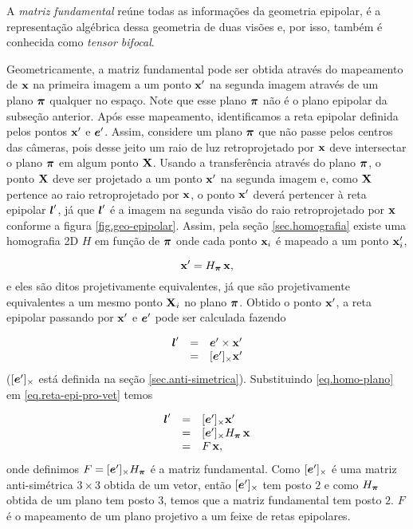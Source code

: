 A \textit{matriz fundamental} reúne todas as informações da geometria epipolar, é a representação algébrica dessa geometria de duas visões e, por isso, também é conhecida como \textit{tensor bifocal}. 

Geometricamente, a matriz fundamental pode ser obtida através do mapeamento de $\mathbf{x}$ na primeira imagem a um ponto $\mathbf{x}'$ na segunda imagem através de um plano $\boldsymbol{\pi}$ qualquer no espaço. Note que esse plano $\boldsymbol{\pi}$ não é o plano epipolar da subseção anterior. Após esse mapeamento, identificamos a reta epipolar definida pelos pontos $\mathbf{x}'$ e $\boldsymbol{e}'$. Assim, considere um plano $\boldsymbol{\pi}$ que não passe pelos centros das câmeras, pois desse jeito um raio de luz retroprojetado por $\mathbf{x}$ deve intersectar o plano $\boldsymbol{\pi}$ em algum ponto $\mathbf{X}$. Usando a transferência através do plano $\boldsymbol{\pi}$, o ponto $\mathbf{X}$ deve ser projetado a um ponto $\mathbf{x}'$ na segunda imagem e, como $\mathbf{X}$ pertence ao raio retroprojetado por $\mathbf{x}$, o ponto $\mathbf{x}'$ deverá pertencer à reta epipolar $\boldsymbol{l}'$, já que $\boldsymbol{l}'$ é a imagem na segunda visão do raio retroprojetado por $\mathbf{x}$ conforme a figura \ref{fig.geo-epipolar}. Assim, pela seção \ref{sec.homografia} existe uma homografia 2D $H$ em função de $\boldsymbol{\pi}$ onde cada ponto $\mathbf{x}_i$ é mapeado a um ponto $\mathbf{x}_i'$, 

\begin{equation}\label{eq.homo-plano}
\mathbf{x}'= H_{\boldsymbol{\pi}} \,\mathbf{x},
\end{equation}
e eles são ditos projetivamente equivalentes, já que são projetivamente equivalentes a um mesmo ponto $\mathbf{X}_i$ no plano $\boldsymbol{\pi}$. Obtido o ponto $\mathbf{x}'$, a reta epipolar passando por $\mathbf{x}'$ e $\boldsymbol{e}'$ pode ser calculada fazendo 

\begin{equation}\label{eq.reta-epi-pro-vet}
\begin{array}{rcl}
\boldsymbol{l}'&=&\boldsymbol{e}'\times\mathbf{x}'\\
&=&[\boldsymbol{e}']_\times\mathbf{x}'
\end{array}
\end{equation}
($[\boldsymbol{e}']_\times$ está definida na seção \ref{sec.anti-simetrica}). Substituindo \ref{eq.homo-plano} em \ref{eq.reta-epi-pro-vet} temos

\begin{equation*}
\begin{array}{rcl}
\boldsymbol{l}'&=&[\boldsymbol{e}']_\times\mathbf{x}'\\
&=&[\boldsymbol{e}']_\times H_{\boldsymbol{\pi}} \,\mathbf{x}\\
&=&F\,\mathbf{x},
\end{array}
\end{equation*} 
onde definimos $F=[\boldsymbol{e}']_\times H_{\boldsymbol{\pi}}$ é a matriz fundamental. Como $[\boldsymbol{e}']_\times$ é uma matriz anti-simétrica $3\times3$ obtida de um vetor, então  $[\boldsymbol{e}']_\times$ tem posto $2$ e como $H_{\boldsymbol{\pi}}$ obtida de um plano tem posto $3$, temos que a matriz fundamental tem posto $2$. $F$ é o mapeamento de um plano projetivo a um feixe de retas epipolares.


